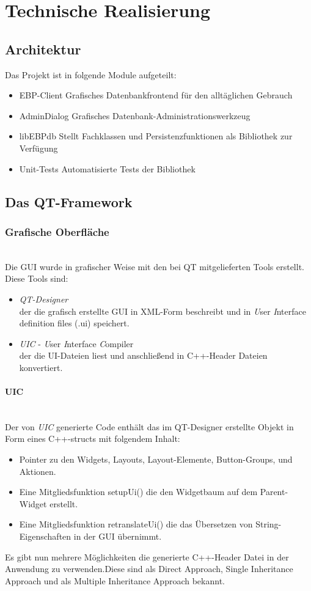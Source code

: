\section{Technische Realisierung}

\subsection{Architektur}
Das Projekt ist in folgende Module aufgeteilt:
\begin{itemize}
	\item EBP-Client
Grafisches Datenbankfrontend für den alltäglichen Gebrauch
	\item AdminDialog
Grafisches Datenbank-Administrationswerkzeug
	\item libEBPdb
Stellt Fachklassen und Persistenzfunktionen als Bibliothek zur Verfügung
	\item Unit-Tests
Automatisierte Tests der Bibliothek
\end{itemize}

\newpage

\subsection{Das QT-Framework}
\subsubsection{Grafische Oberfläche}\mbox{}\\
Die GUI wurde in grafischer Weise mit den bei QT mitgelieferten Tools erstellt.\\Diese Tools sind:
\begin{itemize}
	\item \textit{QT-Designer}\\[\baselineskip]der die grafisch erstellte GUI in XML-Form beschreibt und in \textit{U}ser \textit{I}nterface definition files (.ui) speichert.
	\item \textit{UIC} - \textit{U}ser \textit{I}nterface \textit{C}ompiler\\[\baselineskip]der die UI-Dateien liest und anschließend in C++-Header Dateien konvertiert.
\end{itemize}
\paragraph{UIC}\mbox{}\\
Der von \textit{UIC} generierte Code enthält das im QT-Designer erstellte Objekt in Form eines C++-structs mit folgendem Inhalt:
\begin{itemize}
	\item Pointer zu den Widgets, Layouts, Layout-Elemente, Button-Groups, und Aktionen.
	\item Eine Mitgliedsfunktion setupUi() die den Widgetbaum auf dem Parent-Widget erstellt.
	\item Eine Mitgliedsfunktion retranslateUi() die das Übersetzen von String-Eigenschaften in der GUI übernimmt.
\end{itemize}
Es gibt nun mehrere Möglichkeiten die generierte C++-Header Datei in der Anwendung zu verwenden.Diese sind als Direct Approach, Single Inheritance Approach und als Multiple Inheritance Approach bekannt.
\newpage
